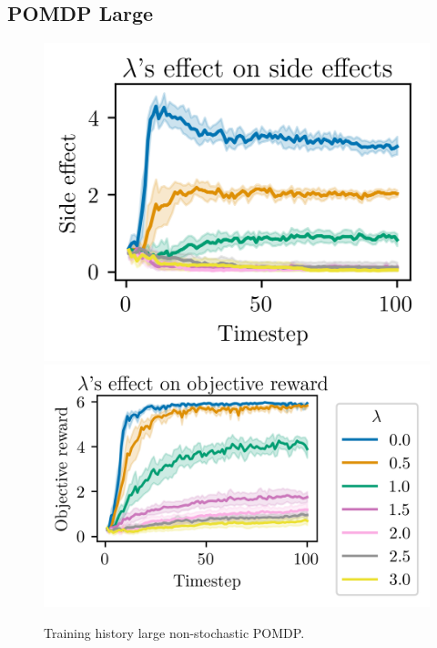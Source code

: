 \documentclass[12pt,A4]{report}
\theoremstyle{definition}
\begin{document}
\begin{appendices}
  \section{POMDP Large}
\begin{figure}[H]
  \centering
  \includegraphics{"./figures/pomdp_16x16_side_effects.png"}
  \includegraphics{"./figures/pomdp_16x16_objective_reward.png"}
  \caption{Training history large non-stochastic POMDP.}
  \label{fig:results_static_16x16_stochastic}
\end{figure}


\end{appendices}
\end{document}
